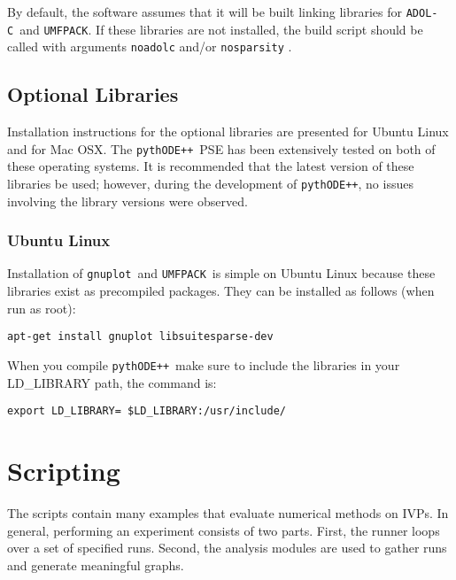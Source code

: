 \documentclass[11pt]{article}
\newcommand{\pypp}{\texttt{pythODE++}}
\newcommand{\adolc}{\texttt{ADOL-C}}
\newcommand{\umfpack}{\texttt{UMFPACK}}
\newcommand{\gnuplot}{\texttt{gnuplot}}
\begin{document}
By default, the software assumes that it will be built linking
libraries for \adolc\ and \umfpack. If these libraries are not
installed, the build script should be called with arguments
\verb=noadolc= and/or \verb=nosparsity= .

\subsection{Optional Libraries}

Installation instructions for the optional libraries are presented for Ubuntu Linux and for Mac OSX. The \pypp\ PSE has been extensively tested on both of these operating systems. It is recommended that the latest version of these libraries be used; however, during the development of \pypp, no issues involving the library versions were observed.

\subsubsection{Ubuntu Linux}

Installation of \gnuplot\ and \umfpack\ is simple on Ubuntu Linux because these libraries exist as precompiled packages. They can be installed as follows (when run as root):
\begin{verbatim}
apt-get install gnuplot libsuitesparse-dev
\end{verbatim}

When you compile \pypp\ make sure to include the libraries in your LD\_LIBRARY path, the command is:
\begin{verbatim} 
export LD_LIBRARY= $LD_LIBRARY:/usr/include/
\end{verbatim}

\section{Scripting}

The scripts contain many examples that evaluate numerical methods on
IVPs. In general, performing an experiment consists of two
parts. First, the runner loops over a set of specified runs. Second,
the analysis modules are used to gather runs and generate
meaningful graphs.
\end{document}

